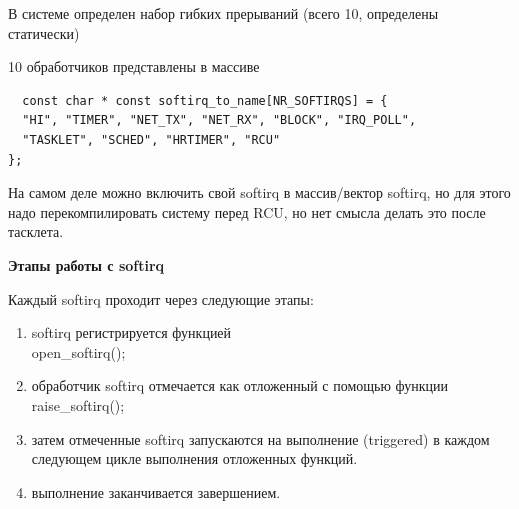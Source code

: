 В системе определен набор гибких прерываний (всего 10, определены статически)
\begin{table}[H]
\begin{center}
\end{center}
\end{table}

10 обработчиков представлены в массиве

\begin{lstlisting}
  const char * const softirq_to_name[NR_SOFTIRQS] = {
  "HI", "TIMER", "NET_TX", "NET_RX", "BLOCK", "IRQ_POLL",
  "TASKLET", "SCHED", "HRTIMER", "RCU"
};
\end{lstlisting}

На самом деле можно включить свой softirq в массив/вектор softirq, но для этого надо перекомпилировать систему перед RCU, но нет смысла делать это после тасклета.

\textbf{Этапы работы с softirq}

Каждый softirq проходит через следующие этапы:

\begin{enumerate}
        \item softirq регистрируется функцией \\ open\_softirq();           
  \item обработчик softirq отмечается как отложенный с помощью функции raise\_softirq();
  \item затем отмеченные softirq запускаются на выполнение (triggered) в каждом следующем цикле выполнения отложенных функций.
  \item выполнение заканчивается завершением.
        
\end{enumerate}

